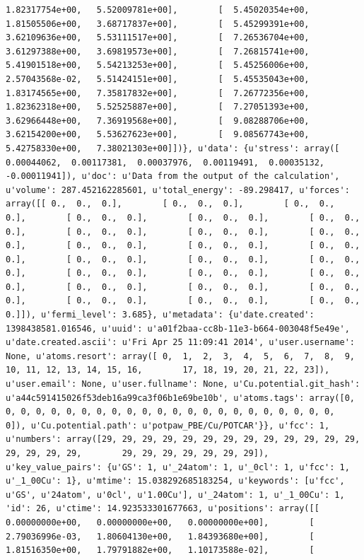 \documentclass[number, sort&compress, review, 12pt]{elsarticle}
\begin{document}
\begin{verbatim}
1.82317754e+00,   5.52009781e+00],        [  5.45020354e+00,
1.81505506e+00,   3.68717837e+00],        [  5.45299391e+00,
3.62109636e+00,   5.53111517e+00],        [  7.26536704e+00,
3.61297388e+00,   3.69819573e+00],        [  7.26815741e+00,
5.41901518e+00,   5.54213253e+00],        [  5.45256006e+00,
2.57043568e-02,   5.51424151e+00],        [  5.45535043e+00,
1.83174565e+00,   7.35817832e+00],        [  7.26772356e+00,
1.82362318e+00,   5.52525887e+00],        [  7.27051393e+00,
3.62966448e+00,   7.36919568e+00],        [  9.08288706e+00,
3.62154200e+00,   5.53627623e+00],        [  9.08567743e+00,
5.42758330e+00,   7.38021303e+00]])}, u'data': {u'stress': array([
0.00044062,  0.00117381,  0.00037976,  0.00119491,  0.00035132,
-0.00011941]), u'doc': u'Data from the output of the calculation',
u'volume': 287.452162285601, u'total_energy': -89.298417, u'forces':
array([[ 0.,  0.,  0.],        [ 0.,  0.,  0.],        [ 0.,  0.,
0.],        [ 0.,  0.,  0.],        [ 0.,  0.,  0.],        [ 0.,  0.,
0.],        [ 0.,  0.,  0.],        [ 0.,  0.,  0.],        [ 0.,  0.,
0.],        [ 0.,  0.,  0.],        [ 0.,  0.,  0.],        [ 0.,  0.,
0.],        [ 0.,  0.,  0.],        [ 0.,  0.,  0.],        [ 0.,  0.,
0.],        [ 0.,  0.,  0.],        [ 0.,  0.,  0.],        [ 0.,  0.,
0.],        [ 0.,  0.,  0.],        [ 0.,  0.,  0.],        [ 0.,  0.,
0.],        [ 0.,  0.,  0.],        [ 0.,  0.,  0.],        [ 0.,  0.,
0.]]), u'fermi_level': 3.685}, u'metadata': {u'date.created':
1398438581.016546, u'uuid': u'a01f2baa-cc8b-11e3-b664-003048f5e49e',
u'date.created.ascii': u'Fri Apr 25 11:09:41 2014', u'user.username':
None, u'atoms.resort': array([ 0,  1,  2,  3,  4,  5,  6,  7,  8,  9,
10, 11, 12, 13, 14, 15, 16,        17, 18, 19, 20, 21, 22, 23]),
u'user.email': None, u'user.fullname': None, u'Cu.potential.git_hash':
u'a44c591415026f53deb16a99ca3f06b1e69be10b', u'atoms.tags': array([0,
0, 0, 0, 0, 0, 0, 0, 0, 0, 0, 0, 0, 0, 0, 0, 0, 0, 0, 0, 0, 0, 0,
0]), u'Cu.potential.path': u'potpaw_PBE/Cu/POTCAR'}}, u'fcc': 1,
u'numbers': array([29, 29, 29, 29, 29, 29, 29, 29, 29, 29, 29, 29, 29,
29, 29, 29, 29,        29, 29, 29, 29, 29, 29, 29]),
u'key_value_pairs': {u'GS': 1, u'_24atom': 1, u'_0cl': 1, u'fcc': 1,
u'_1_00Cu': 1}, u'mtime': 15.038292685183254, u'keywords': [u'fcc',
u'GS', u'24atom', u'0cl', u'1.00Cu'], u'_24atom': 1, u'_1_00Cu': 1,
'id': 26, u'ctime': 14.923533301677663, u'positions': array([[
0.00000000e+00,   0.00000000e+00,   0.00000000e+00],        [
2.79036996e-03,   1.80604130e+00,   1.84393680e+00],        [
1.81516350e+00,   1.79791882e+00,   1.10173588e-02],        [

\end{verbatim}
\end{document}
